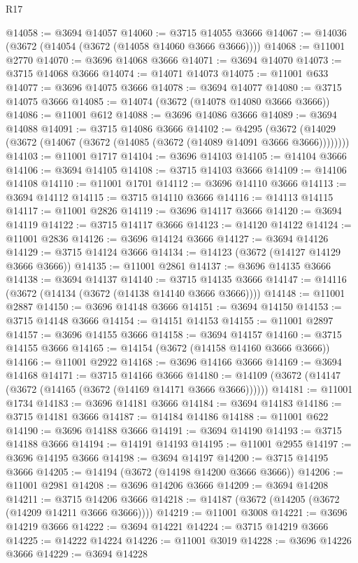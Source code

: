 \begin{lexlean}{R17}
\begin{coremodule}
@14058 := @3694 @14057
@14060 := @3715 @14055 @3666
@14067 := @14036 (@3672 (@14054 (@3672 (@14058 @14060 @3666 @3666))))
@14068 := @11001 @2770
@14070 := @3696 @14068 @3666
@14071 := @3694 @14070
@14073 := @3715 @14068 @3666
@14074 := @14071 @14073
@14075 := @11001 @633
@14077 := @3696 @14075 @3666
@14078 := @3694 @14077
@14080 := @3715 @14075 @3666
@14085 := @14074 (@3672 (@14078 @14080 @3666 @3666))
@14086 := @11001 @612
@14088 := @3696 @14086 @3666
@14089 := @3694 @14088
@14091 := @3715 @14086 @3666
@14102 := @4295
    (@3672 (@14029 (@3672 (@14067 (@3672 (@14085 (@3672 (@14089 @14091 @3666 @3666))))))))
@14103 := @11001 @1717
@14104 := @3696 @14103
@14105 := @14104 @3666
@14106 := @3694 @14105
@14108 := @3715 @14103 @3666
@14109 := @14106 @14108
@14110 := @11001 @1701
@14112 := @3696 @14110 @3666
@14113 := @3694 @14112
@14115 := @3715 @14110 @3666
@14116 := @14113 @14115
@14117 := @11001 @2826
@14119 := @3696 @14117 @3666
@14120 := @3694 @14119
@14122 := @3715 @14117 @3666
@14123 := @14120 @14122
@14124 := @11001 @2836
@14126 := @3696 @14124 @3666
@14127 := @3694 @14126
@14129 := @3715 @14124 @3666
@14134 := @14123 (@3672 (@14127 @14129 @3666 @3666))
@14135 := @11001 @2861
@14137 := @3696 @14135 @3666
@14138 := @3694 @14137
@14140 := @3715 @14135 @3666
@14147 := @14116 (@3672 (@14134 (@3672 (@14138 @14140 @3666 @3666))))
@14148 := @11001 @2887
@14150 := @3696 @14148 @3666
@14151 := @3694 @14150
@14153 := @3715 @14148 @3666
@14154 := @14151 @14153
@14155 := @11001 @2897
@14157 := @3696 @14155 @3666
@14158 := @3694 @14157
@14160 := @3715 @14155 @3666
@14165 := @14154 (@3672 (@14158 @14160 @3666 @3666))
@14166 := @11001 @2922
@14168 := @3696 @14166 @3666
@14169 := @3694 @14168
@14171 := @3715 @14166 @3666
@14180 := @14109 (@3672 (@14147 (@3672 (@14165 (@3672 (@14169 @14171 @3666 @3666))))))
@14181 := @11001 @1734
@14183 := @3696 @14181 @3666
@14184 := @3694 @14183
@14186 := @3715 @14181 @3666
@14187 := @14184 @14186
@14188 := @11001 @622
@14190 := @3696 @14188 @3666
@14191 := @3694 @14190
@14193 := @3715 @14188 @3666
@14194 := @14191 @14193
@14195 := @11001 @2955
@14197 := @3696 @14195 @3666
@14198 := @3694 @14197
@14200 := @3715 @14195 @3666
@14205 := @14194 (@3672 (@14198 @14200 @3666 @3666))
@14206 := @11001 @2981
@14208 := @3696 @14206 @3666
@14209 := @3694 @14208
@14211 := @3715 @14206 @3666
@14218 := @14187 (@3672 (@14205 (@3672 (@14209 @14211 @3666 @3666))))
@14219 := @11001 @3008
@14221 := @3696 @14219 @3666
@14222 := @3694 @14221
@14224 := @3715 @14219 @3666
@14225 := @14222 @14224
@14226 := @11001 @3019
@14228 := @3696 @14226 @3666
@14229 := @3694 @14228

\end{coremodule}
\end{lexlean}
